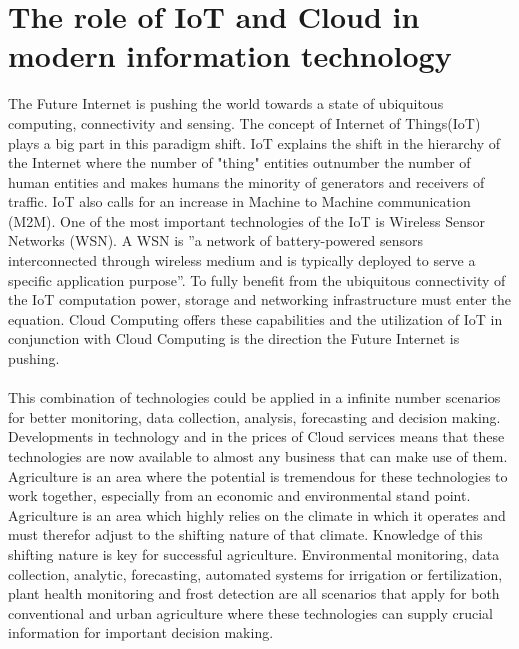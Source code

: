 \documentclass[]{uiophd}
\begin{document}
\section{The role of IoT and Cloud in modern information technology}
The Future Internet is pushing the world towards a state of ubiquitous computing, connectivity and sensing. The concept of Internet of Things(IoT) plays a big part in this paradigm shift. IoT explains the shift in the hierarchy of the Internet where the number of "thing" entities outnumber the number of human entities and makes humans the minority of generators and receivers of traffic. IoT also calls for an increase in Machine to Machine communication (M2M). One of the most important technologies of the IoT is Wireless Sensor Networks (WSN). A WSN is ''a network of battery-powered sensors interconnected through wireless medium and is typically deployed to serve a specific application purpose''\cite{Ojha2015662}. To fully benefit from the ubiquitous connectivity of the IoT computation power, storage and networking infrastructure must enter the equation. Cloud Computing offers these capabilities and the utilization of IoT in conjunction with Cloud Computing is the direction the Future Internet is pushing. 
\\\\
This combination of technologies could be applied in a infinite number scenarios for better monitoring, data collection, analysis, forecasting and decision making. Developments in technology and in the prices of Cloud services means that these technologies are now available to almost any business that can make use of them. Agriculture is an area where the potential is tremendous for these technologies to work together, especially from an economic and environmental stand point. Agriculture is an area which highly relies on the climate in which it operates and must therefor adjust to the shifting nature of that climate. Knowledge of this shifting nature is key for successful agriculture. Environmental monitoring, data collection, analytic, forecasting, automated systems for irrigation or fertilization, plant health monitoring and frost detection are all scenarios that apply for both conventional and urban agriculture where these technologies can supply crucial information for important decision making.
\end{document}
